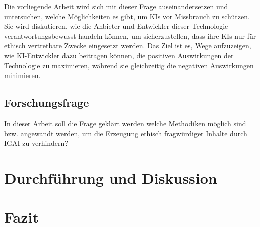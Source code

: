 \documentclass[12pt]{article}
\begin{document}
 Die vorliegende Arbeit wird sich mit dieser Frage auseinandersetzen und untersuchen, welche Möglichkeiten es gibt, um KIs vor 
 Missbrauch zu schützen. Sie wird diskutieren, wie die Anbieter und Entwickler dieser Technologie verantwortungsbewusst 
 handeln können, um sicherzustellen, dass ihre KIs nur für ethisch vertretbare Zwecke eingesetzt werden. Das Ziel ist es, 
 Wege aufzuzeigen, wie KI-Entwickler dazu beitragen können, die positiven Auswirkungen der Technologie zu maximieren, 
 während sie gleichzeitig die negativen Auswirkungen minimieren.
 \subsection{Forschungsfrage}
 In dieser Arbeit soll die Frage geklärt werden welche Methodiken möglich sind bzw. angewandt werden, um die Erzeugung ethisch 
 fragwürdiger Inhalte durch IGAI zu verhindern?
 

\section{Durchführung und Diskussion}
\section{Fazit}


\end{document}
